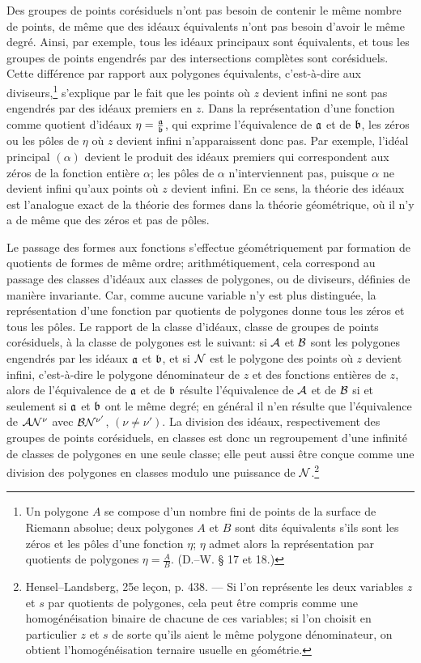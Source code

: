 Des groupes de points corésiduels n'ont pas besoin de contenir le même nombre de points, de même que des idéaux équivalents n'ont pas besoin d'avoir le même degré. Ainsi, par exemple, tous les idéaux principaux sont équivalents, et tous les groupes de points engendrés par des intersections complètes sont corésiduels. Cette différence par rapport aux polygones équivalents, c'est-à-dire aux diviseurs,\footnote{Un polygone \(A\) se compose d'un nombre fini de points de la surface de Riemann absolue; deux polygones \(A\) et \(B\) sont dits équivalents s'ils sont les zéros et les pôles d'une fonction \(\eta\); \(\eta\) admet alors la représentation par quotients de polygones \(\eta=\frac{A}{B}\). (D.--W. \S{} 17 et 18.)} s'explique par le fait que les points où \(z\) devient infini ne sont pas engendrés par des idéaux premiers en \(z\). Dans la représentation d'une fonction comme quotient d'idéaux \(\eta=\frac{\mathfrak a}{\mathfrak b}\), qui exprime l'équivalence de \(\mathfrak a\) et de \(\mathfrak b\), les zéros ou les pôles de \(\eta\) où \(z\) devient infini n'apparaissent donc pas. Par exemple, l'idéal principal \((\alpha)\) devient le produit des idéaux premiers qui correspondent aux zéros de la fonction entière \(\alpha\); les pôles de \(\alpha\) n'interviennent pas, puisque \(\alpha\) ne devient infini qu'aux points où \(z\) devient infini. En ce sens, la théorie des idéaux est l'analogue exact de la théorie des formes dans la théorie géométrique, où il n'y a de même que des zéros et pas de pôles.

Le passage des formes aux fonctions s'effectue géométriquement par formation de quotients de formes de même ordre; arithmétiquement, cela correspond au passage des classes d'idéaux aux classes de polygones, ou de diviseurs, définies de manière invariante. Car, comme aucune variable n'y est plus distinguée, la représentation d'une fonction par quotients de polygones donne tous les zéros et tous les pôles. Le rapport de la classe d'idéaux, classe de groupes de points corésiduels, à la classe de polygones est le suivant: si \(\mathcal A\) et \(\mathcal B\) sont les polygones engendrés par les idéaux \(\mathfrak a\) et \(\mathfrak b\), et si \(\mathcal N\) est le polygone des points où \(z\) devient infini, c'est-à-dire le polygone dénominateur de \(z\) et des fonctions entières de \(z\), alors de l'équivalence de \(\mathfrak a\) et de \(\mathfrak b\) résulte l'équivalence de \(\mathcal A\) et de \(\mathcal B\) si et seulement si \(\mathfrak a\) et \(\mathfrak b\) ont le même degré; en général il n'en résulte que l'équivalence de \(\mathcal A\mathcal N^\nu\) avec \(\mathcal B\mathcal N^{\nu'}\), \((\nu\ne\nu')\). La division des idéaux, respectivement des groupes de points corésiduels, en classes est donc un regroupement d'une infinité de classes de polygones en une seule classe; elle peut aussi être conçue comme une division des polygones en classes modulo une puissance de \(\mathcal N\).\footnote{Hensel--Landsberg, 25e leçon, p. 438. --- Si l'on représente les deux variables \(z\) et \(s\) par quotients de polygones, cela peut être compris comme une homogénéisation binaire de chacune de ces variables; si l'on choisit en particulier \(z\) et \(s\) de sorte qu'ils aient le même polygone dénominateur, on obtient l'homogénéisation ternaire usuelle en géométrie.}

